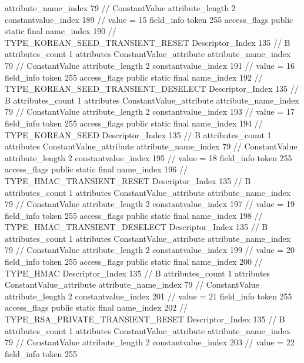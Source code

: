 {{{{{{{					attribute_name_index	79		// ConstantValue
					attribute_length	2
					constantvalue_index	189		// value = 15
				}
				}
			}
			field_info {
				token	255
				access_flags	public static final
				name_index	190		// TYPE_KOREAN_SEED_TRANSIENT_RESET
				Descriptor_Index	135		// B
				attributes_count	1
				attributes {
				ConstantValue_attribute {
					attribute_name_index	79		// ConstantValue
					attribute_length	2
					constantvalue_index	191		// value = 16
				}
				}
			}
			field_info {
				token	255
				access_flags	public static final
				name_index	192		// TYPE_KOREAN_SEED_TRANSIENT_DESELECT
				Descriptor_Index	135		// B
				attributes_count	1
				attributes {
				ConstantValue_attribute {
					attribute_name_index	79		// ConstantValue
					attribute_length	2
					constantvalue_index	193		// value = 17
				}
				}
			}
			field_info {
				token	255
				access_flags	public static final
				name_index	194		// TYPE_KOREAN_SEED
				Descriptor_Index	135		// B
				attributes_count	1
				attributes {
				ConstantValue_attribute {
					attribute_name_index	79		// ConstantValue
					attribute_length	2
					constantvalue_index	195		// value = 18
				}
				}
			}
			field_info {
				token	255
				access_flags	public static final
				name_index	196		// TYPE_HMAC_TRANSIENT_RESET
				Descriptor_Index	135		// B
				attributes_count	1
				attributes {
				ConstantValue_attribute {
					attribute_name_index	79		// ConstantValue
					attribute_length	2
					constantvalue_index	197		// value = 19
				}
				}
			}
			field_info {
				token	255
				access_flags	public static final
				name_index	198		// TYPE_HMAC_TRANSIENT_DESELECT
				Descriptor_Index	135		// B
				attributes_count	1
				attributes {
				ConstantValue_attribute {
					attribute_name_index	79		// ConstantValue
					attribute_length	2
					constantvalue_index	199		// value = 20
				}
				}
			}
			field_info {
				token	255
				access_flags	public static final
				name_index	200		// TYPE_HMAC
				Descriptor_Index	135		// B
				attributes_count	1
				attributes {
				ConstantValue_attribute {
					attribute_name_index	79		// ConstantValue
					attribute_length	2
					constantvalue_index	201		// value = 21
				}
				}
			}
			field_info {
				token	255
				access_flags	public static final
				name_index	202		// TYPE_RSA_PRIVATE_TRANSIENT_RESET
				Descriptor_Index	135		// B
				attributes_count	1
				attributes {
				ConstantValue_attribute {
					attribute_name_index	79		// ConstantValue
					attribute_length	2
					constantvalue_index	203		// value = 22
				}
				}
			}
			field_info {
				token	255
}}}}}
